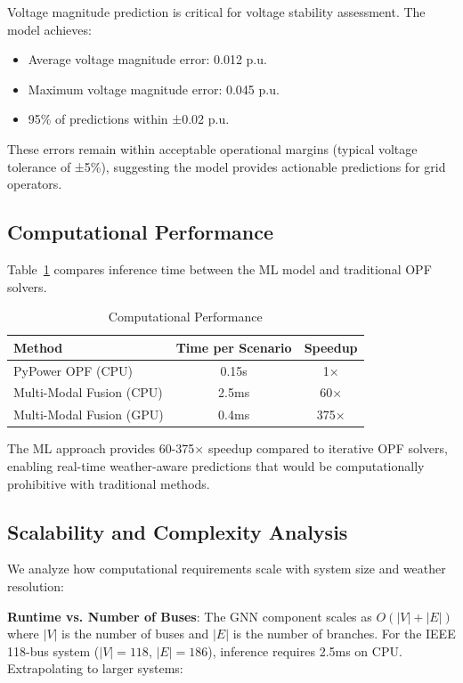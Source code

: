 \documentclass[journal,12pt,onecolumn]{IEEEtran}
\begin{document}
Voltage magnitude prediction is critical for voltage stability assessment. The model achieves:
\begin{itemize}
    \item Average voltage magnitude error: 0.012 p.u.
    \item Maximum voltage magnitude error: 0.045 p.u.
    \item 95\% of predictions within ±0.02 p.u.
\end{itemize}

These errors remain within acceptable operational margins (typical voltage tolerance of ±5\%), suggesting the model provides actionable predictions for grid operators.

\subsection{Computational Performance}

Table~\ref{tab:computational} compares inference time between the ML model and traditional OPF solvers.

\begin{table}[htbp]
\caption{Computational Performance}
\label{tab:computational}
\centering
\begin{tabular}{lcc}
\toprule
\textbf{Method} & \textbf{Time per Scenario} & \textbf{Speedup} \\
\midrule
PyPower OPF (CPU) & 0.15s & 1× \\
Multi-Modal Fusion (CPU) & 2.5ms & 60× \\
Multi-Modal Fusion (GPU) & 0.4ms & 375× \\
\bottomrule
\end{tabular}
\end{table}

The ML approach provides 60-375× speedup compared to iterative OPF solvers, enabling real-time weather-aware predictions that would be computationally prohibitive with traditional methods.

\subsection{Scalability and Complexity Analysis}

We analyze how computational requirements scale with system size and weather resolution:

\textbf{Runtime vs. Number of Buses}: The GNN component scales as $O(|V| + |E|)$ where $|V|$ is the number of buses and $|E|$ is the number of branches. For the IEEE 118-bus system ($|V|=118$, $|E|=186$), inference requires 2.5ms on CPU. Extrapolating to larger systems:
\end{document}
